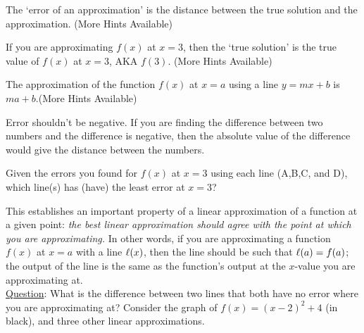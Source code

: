 \documentclass[handout,nooutcomes]{ximera}
\begin{document}
\begin{question}
\begin{hint}
The `error of an approximation' is the distance between the true solution
and the approximation. (More Hints Available)
\end{hint}
\begin{hint}
If you are approximating $f(x)$ at $x=3$, then the `true solution' is the
true value of $f(x)$ at $x=3$, AKA $f(3)$. (More Hints Available)
\end{hint}
\begin{hint}
The approximation of the function $f(x)$ at $x=a$ using a line 
$y=mx+b$ is $ma+b$.(More Hints Available)
\end{hint}
\begin{hint}
Error shouldn't be negative. If you are finding the difference
between two numbers and the difference is negative, then the absolute
value of the difference would give the distance between the numbers.
\end{hint}
\end{question}

\begin{question}
Given the errors you found for $f(x)$ at $x=3$ using  each line (A,B,C, and D), which line(s) has (have) the least error at $x=3$?
\begin{selectAll}
\end{selectAll}
\end{question}


This establishes an important property of a linear approximation
of a function at a given point: {\it the best linear approximation
should agree with the point at which you are approximating.}
In other words, if you are approximating a function $f(x)$ at $x=a$ with a
line $\ell(x)$, then the line should be such that $\ell(a)=f(a)$;
the output of the line is the same as the function's output at the $x$-value you are approximating at.\\

\underline{Question}: What is the difference between two lines that both
have no error where you are approximating at?
Consider the graph of $f(x)= (x-2)^2 + 4$ (in black), and three other linear approximations.
\end{document}
